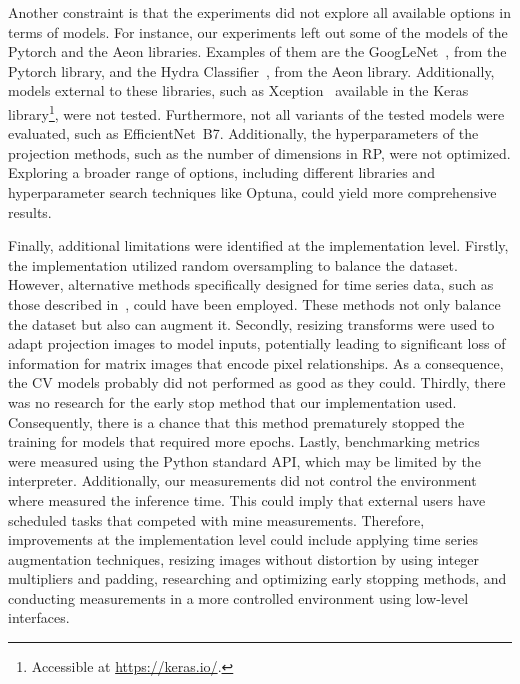 Another constraint is that the experiments did not explore all available options in terms of models. For instance, our experiments left out some of the models of the Pytorch and the Aeon libraries. Examples of them are the GoogLeNet~\cite{GoogLeNet}, from the Pytorch library, and the Hydra Classifier~\cite{HydraClassifier}, from the Aeon library.  Additionally, models external to these libraries, such as Xception~\cite{Xception} available in the Keras library\footnote{Accessible at \url{https://keras.io/}.}, were not tested. Furthermore, not all variants of the tested models were evaluated, such as EfficientNet~B7. Additionally, the hyperparameters of the projection methods, such as the number of dimensions in \gls{RP}, were not optimized. Exploring a broader range of options, including different libraries and hyperparameter search techniques like Optuna, could yield more comprehensive results.

Finally, additional limitations were identified at the implementation level.  Firstly, the implementation utilized random oversampling to balance the dataset. However, alternative methods specifically designed for time series data, such as those described in~\cite{TimeSeriesAugmentation}, could have been employed.  These methods not only balance the dataset but also can augment it. Secondly, resizing transforms were used to adapt projection images to model inputs, potentially leading to significant loss of information for matrix images that encode pixel relationships. As a consequence, the \gls{CV} models probably did not performed as good as they could. Thirdly, there was no research for the early stop method that our implementation used. Consequently, there is a chance that this method prematurely stopped the training for models that required more epochs. Lastly, benchmarking metrics were measured using the Python standard API, which may be limited by the interpreter. Additionally, our measurements did not control the environment where measured the inference time. This could imply that external users have scheduled tasks that competed with mine measurements. Therefore, improvements at the implementation level could include applying time series augmentation techniques, resizing images without distortion by using integer multipliers and padding, researching and optimizing early stopping methods, and conducting measurements in a more controlled environment using low-level interfaces.

